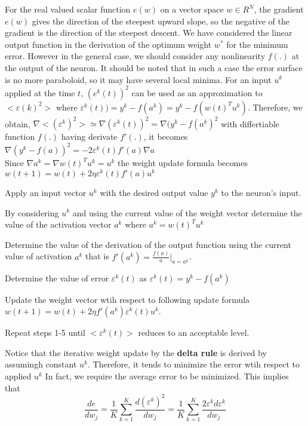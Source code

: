 \documentclass[12pt, a4paper, twoside]{book}
\begin{document}
For the real valued scalar function $e(w)$ on a vector space $w \in R^N$, the gradient $e(w)$ gives the direction of the steepest upward slope, so the negative of the gradient is the direction of the steepest descent. 
We have considered the linear output function in the derivation of the optimum weight $w^*$ for the minimum error. However in the general case, we should consider any nonlinearity $f(.)$ at the output of the neuron.
It should be noted that in such a case the error surface is no more paraboloid, so it may have several local minima.
For an input $u^k$ applied at the time $t$, $(e^k(t))^2$ can be used as an approximation to $<\varepsilon(k)^2>$ where $\varepsilon^k(t))=y^k - f(a^k) = y^k - f(w(t)^Tu^k)$. Therefore, we obtain, $\nabla <(\varepsilon^k)^2 > \simeq \nabla(\varepsilon^k(t))^2 = \nabla(y^k - f(a^k)^2$ with differtiable function $f(.)$ having derivate $f'(.)$, it becomes $\nabla(y^k-f(a))^2= -2\varepsilon^k(t)f'(a)\nabla a$ \\

Since $\nabla a^k = \nabla w(t)^Tu^k=u^k$ the weight update formula becomes $ w(t+1) = w(t) + 2\eta\varepsilon^k(t)f'(a)u^k$

\begin{steps}
    \item Apply an input vector $u^k$ with the desired output value $y^k$ to the neuron's input.
    \item By considering $u^k$ and using the current value of the weight vector determine the value of the activation vector $a^k$ where $a^k=w(t)^Tu^k$
    \item Determine the value of the derivation of the output function using the current value of activation $a^k$ that is $f'(a^k)= \frac{f(a)}{a}|_{a=a^k}$.
    \item Determine the value of error $\varepsilon^k(t)$ as $\varepsilon^k(t) = y^k - f(a^k)$
    \item Update the weight vector wtih respect to following update formula $w(t+1) = w(t) + 2\eta f'(a^k)\varepsilon^k(t)u^k$.
    \item Repeat steps 1-5 until $<\varepsilon^k(t)>$ reduces to an acceptable level.
\end{steps}

Notice that the iterative weight update by the \textbf{delta rule} is derived by assumingh constant $u^k$. Therefore, it tends to minimize the error wtih respect to applied $u^k$
In fact, we require the average error to be minimized. This implies that 
\[\frac{de}{dw_j}=  \frac{1}{K} \sum_{k = 1}^{K}\frac{d(\varepsilon^k)^2}{dw_j} = \dfrac{1}{K} \sum_{k=1}^{K} \frac{2\varepsilon^kd\varepsilon^k}{dw_j}\]
\end{document}
